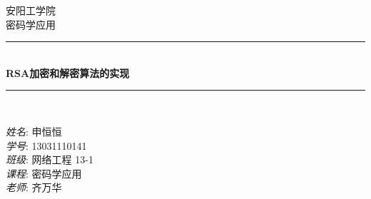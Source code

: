 \documentclass[UTF8,nofonts,cs4size]{ctexrep}
\begin{document}
\begin{titlepage}

\newcommand{\HRule}{\rule{\linewidth}{0.5mm}} %

\center %
 

\textsc{\LARGE 安阳工学院}\\[1.5cm] %
\textsc{\Large 密码学应用}\\[0.5cm] %



\HRule \\[0.4cm]
{ \huge \bfseries RSA加密和解密算法的实现}\\[0.4cm] %
\HRule \\[1.5cm]
 

\begin{minipage}{0.4\textwidth}
\begin{flushleft}
\large
\emph{姓名}\textsc{: 申恒恒} \\
\emph{学号}\textsc{: 13031110141}\\
\emph{班级}\textsc{: 网络工程 13-1}\\
\emph{课程}\textsc{: 密码学应用}\\
\emph{老师}\textsc{: 齐万华} %
\end{flushleft}\end{minipage}\\[10cm]




\end{titlepage}
\end{document}
